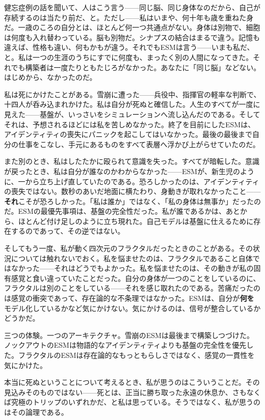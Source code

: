 \documentclass[11pt, twoside, openright]{book}
\begin{document}
健忘症例の話を聞いて、人はこう言う------同じ脳、同じ身体なのだから、自己が存続するのは当たり前だ、と。ただし------私はいまや、何十年も歳を重ねた身だ。一歳のころの自分とは、ほとんど何一つ共通点がない。身体は別物で、細胞は何度も入れ替わっている。脳も別物だ。シナプスの結合はまるで違う。記憶も違えば、性格も違い、何もかもが違う。それでもESMは言う------いまも私だ、と。私は一つの生涯のうちにすでに何度も、まったく別の人間になってきた。それでも構築者は一度たりともたじろがなかった。あなたに「同じ脳」などない。はじめから、なかったのだ。

私は死にかけたことがある。雪崩に遭った------兵役中、指揮官の軽率な判断で、十四人が呑み込まれかけた。私は自分が死ぬと確信した。人生のすべてが一度に見えた------基盤が、いっさいをシミュレーションへ流し込んだのである。そしてそれは、予想されるほどには私を苦しめなかった。終了を目前にしたESMは、アイデンティティの喪失にパニックを起こしてはいなかった。最後の最後まで自分の仕事をこなし、手元にあるものをすべて表層へ浮かび上がらせていたのだ。

また別のとき、私はしたたかに殴られて意識を失った。すべてが暗転した。意識が戻ったとき、私は自分が誰なのかわからなかった------ESMが、新生児のように、一から立ち上げ直していたのである。恐ろしかったのは、アイデンティティの喪失ではない。数秒のあいだ地面に横たわり、身動きが取れなかったこと------\textbf{それ}こそが恐ろしかった。「私は誰か」ではなく、「私の身体は無事か」だったのだ。ESMの最優先事項は、基盤の完全性だった。私が誰であるかは、あとから、ほとんど付け足しのように立ち現れた。自己モデルは基盤に仕えるために存在するのであって、その逆ではない。

そしてもう一度、私が動く四次元のフラクタルだったときのことがある。その状況については触れないでおく。私を悩ませたのは、フラクタルであること自体ではなかった------それはどうでもよかった。私を悩ませたのは、その動きが私の固有感覚と食い違っていたことだった。自分の身体が一つのことをしているのに、フラクタルは別のことをしている------それを感じ取れたのである。苦痛だったのは感覚の衝突であって、存在論的な不条理ではなかった。ESMは、自分が\textbf{何を}モデル化しているかなど気にかけない。気にかけるのは、信号が整合しているかどうかだ。

三つの体験。一つのアーキテクチャ。雪崩のESMは最後まで構築しつづけた。ノックアウトのESMは物語的なアイデンティティよりも基盤の完全性を優先した。フラクタルのESMは存在論的なもっともらしさではなく、感覚の一貫性を気にかけた。

本当に死ぬということについて考えるとき、私が思うのはこういうことだ。その見込みそのものではない------死とは、正当に勝ち取った永遠の休息か、さもなくば究極のトリップのいずれかだ、と私は思っている。そうではなく、私が思うのはその論理である。
\end{document}
